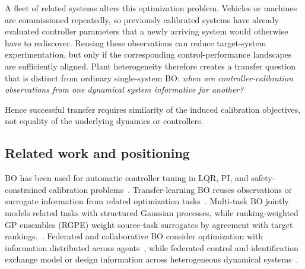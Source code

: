 \documentclass{l4dc2026}
\begin{document}
A fleet of related systems alters this optimization problem. 
Vehicles or machines are commissioned repeatedly, so previously calibrated systems have already evaluated controller parameters that a newly arriving system would otherwise have to rediscover. 
Reusing these observations can reduce target-system experimentation, but only if the corresponding control-performance landscapes are sufficiently aligned.
Plant heterogeneity therefore creates a transfer question that is distinct from ordinary single-system BO: \emph{when are controller-calibration observations from one dynamical system informative for another?}

Hence successful transfer requires similarity of the induced calibration objectives, not equality of the underlying dynamics or controllers.

\subsection{Related work and positioning}
BO has been used for automatic controller tuning in LQR, PI, and safety-constrained calibration problems~\citep{marco2016lqr,berkenkamp2016safe,schillinger2017safe,vonrohr2024local}. 
Transfer-learning BO reuses observations or surrogate information from related optimization tasks~\citep{joy2019transfer,tighineanu2022transfer,perrone2018scalable}. 
Multi-task BO jointly models related tasks with structured Gaussian processes, while ranking-weighted GP ensembles (RGPE) weight source-task surrogates by agreement with target rankings.~\citep{feurer2018rgpe}. 
Federated and collaborative BO consider optimization with information distributed across agents~\citep{dai2020fts,dai2021dpfts,chen2025collaborative}, while federated control and identification exchange model or design information across heterogeneous dynamical systems~\citep{wang2026fedlqr,weber2026ifac}.

\end{document}
